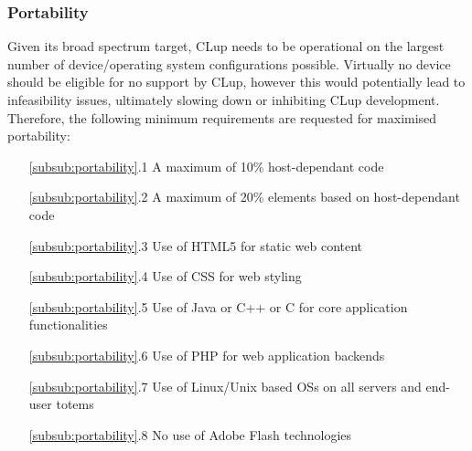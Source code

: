\subsubsection{Portability \label{subsub:portability}}
Given its broad spectrum target, CLup needs to be operational on the largest number of device/operating system configurations possible. Virtually no device should be eligible for no support by CLup, however this would potentially lead to infeasibility issues, ultimately slowing down or inhibiting CLup development. \newline
Therefore, the following minimum requirements are requested for maximised portability:\newline
\begin{itemize}[leftmargin=+.8in]
    \item[\ref{subsub:portability}.1] A maximum of 10\% host-dependant code
    \item[\ref{subsub:portability}.2] A maximum of 20\% elements based on host-dependant code
    \item[\ref{subsub:portability}.3] Use of HTML5 for static web content
    \item[\ref{subsub:portability}.4] Use of CSS for web styling
    \item[\ref{subsub:portability}.5] Use of Java or C++ or C for core application functionalities
    \item[\ref{subsub:portability}.6] Use of PHP for web application backends
    \item[\ref{subsub:portability}.7] Use of Linux/Unix based OSs on all servers and end-user totems
    \item[\ref{subsub:portability}.8] No use of Adobe \textregistered \space Flash \textregistered \space technologies
\end{itemize}

